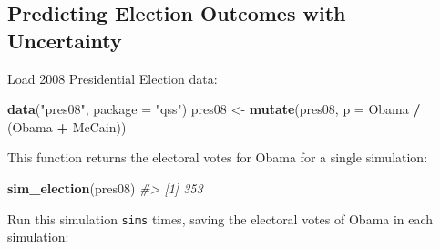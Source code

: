 \documentclass[]{book}
\newenvironment{Shaded}{\begin{snugshade}}{\end{snugshade}}
\newcommand{\KeywordTok}[1]{\textcolor[rgb]{0.13,0.29,0.53}{\textbf{#1}}}
\newcommand{\DataTypeTok}[1]{\textcolor[rgb]{0.13,0.29,0.53}{#1}}
\newcommand{\DecValTok}[1]{\textcolor[rgb]{0.00,0.00,0.81}{#1}}
\newcommand{\StringTok}[1]{\textcolor[rgb]{0.31,0.60,0.02}{#1}}
\newcommand{\CommentTok}[1]{\textcolor[rgb]{0.56,0.35,0.01}{\textit{#1}}}
\newcommand{\ControlFlowTok}[1]{\textcolor[rgb]{0.13,0.29,0.53}{\textbf{#1}}}
\newcommand{\OperatorTok}[1]{\textcolor[rgb]{0.81,0.36,0.00}{\textbf{#1}}}
\newcommand{\NormalTok}[1]{#1}
\theoremstyle{definition}
\theoremstyle{definition}
\theoremstyle{definition}
\theoremstyle{remark}
\begin{document}
\subsection{Predicting Election Outcomes with
Uncertainty}\label{predicting-election-outcomes-with-uncertainty-1}

Load 2008 Presidential Election data:

\begin{Shaded}
\begin{Highlighting}[]
\KeywordTok{data}\NormalTok{(}\StringTok{"pres08"}\NormalTok{, }\DataTypeTok{package =} \StringTok{"qss"}\NormalTok{)}
\NormalTok{pres08 <-}\StringTok{ }\KeywordTok{mutate}\NormalTok{(pres08, }\DataTypeTok{p =}\NormalTok{ Obama }\OperatorTok{/}\StringTok{ }\NormalTok{(Obama }\OperatorTok{+}\StringTok{ }\NormalTok{McCain))}
\end{Highlighting}
\end{Shaded}

\begin{Shaded}
\end{Shaded}

This function returns the electoral votes for Obama for a single
simulation:

\begin{Shaded}
\begin{Highlighting}[]
\KeywordTok{sim_election}\NormalTok{(pres08)}
\CommentTok{#> [1] 353}
\end{Highlighting}
\end{Shaded}

Run this simulation \texttt{sims} times, saving the electoral votes of
Obama in each simulation:
\end{document}
